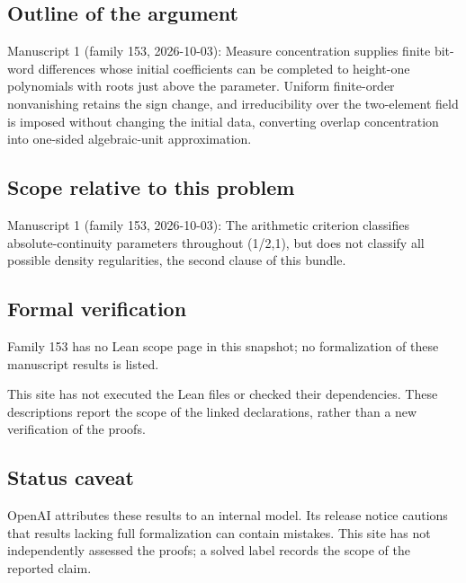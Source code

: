 \documentclass[11pt]{article}
\begin{document}
\subsection{Outline of the argument}
Manuscript 1 (family 153, 2026-10-03): Measure concentration supplies finite bit-word differences whose initial coefficients can be completed to height-one polynomials with roots just above the parameter. Uniform finite-order nonvanishing retains the sign change, and irreducibility over the two-element field is imposed without changing the initial data, converting overlap concentration into one-sided algebraic-unit approximation.

\subsection{Scope relative to this problem}
Manuscript 1 (family 153, 2026-10-03): The arithmetic criterion classifies absolute-continuity parameters throughout (1/2,1), but does not classify all possible density regularities, the second clause of this bundle.

\subsection{Formal verification}
Family 153 has no Lean scope page in this snapshot; no formalization of these manuscript results is listed.

This site has not executed the Lean files or checked their dependencies. These descriptions report the scope of the linked declarations, rather than a new verification of the proofs.

\subsection{Status caveat}
OpenAI attributes these results to an internal model. Its release notice cautions that results lacking full formalization can contain mistakes. This site has not independently assessed the proofs; a solved label records the scope of the reported claim.
\end{document}

